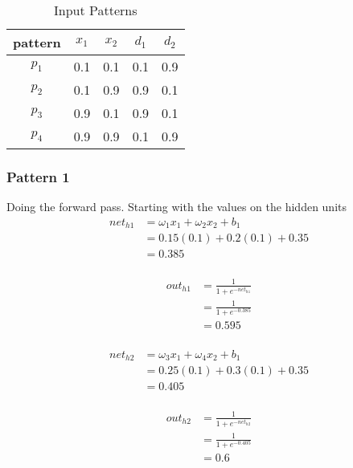 \documentclass[10pt,a4paper]{article}
\begin{document}
\begin{table}
\begin{tabular}{|c|c|c|c|c|}
\hline
pattern & $x_1$ & $x_2$ & $d_1$ & $d_2$ \\
\hline
$p_1$ & 0.1 & 0.1 & 0.1 & 0.9 \\
$p_2$ & 0.1 & 0.9 & 0.9 & 0.1 \\
$p_3$ & 0.9 & 0.1 & 0.9 & 0.1 \\
$p_4$ & 0.9 & 0.9 & 0.1 & 0.9 \\
\hline
\end{tabular}
\caption{Input Patterns}\label{inputPatters}
\end{table}




\subsubsection{Pattern 1}
Doing the forward pass. Starting with the values on the hidden units
\begin{equation}
\begin{split}
net_{h1} &= \omega_1 x_1 + \omega_2 x_2 + b_1 \\
         &= 0.15(0.1) + 0.2(0.1) + 0.35 \\
         &= 0.385\\
\end{split}
\end{equation}

\begin{equation}
\begin{split}
out_{h1} &= \frac{1}{1+e^{-net_{h1}}}\\ 
         &= \frac{1}{1+e^{-0.385}}\\ 
         &= 0.595\\
\end{split}
\end{equation}

\begin{equation}
\begin{split}
net_{h2} &= \omega_3 x_1 + \omega_4 x_2 + b_1 \\
         &= 0.25(0.1) + 0.3(0.1) + 0.35 \\
         &= 0.405\\
\end{split}
\end{equation}

\begin{equation}
\begin{split}
out_{h2} &= \frac{1}{1+e^{-net_{h2}}}\\ 
         &= \frac{1}{1+e^{-0.405}}\\ 
         &= 0.6\\
\end{split}
\end{equation}
\end{document}
